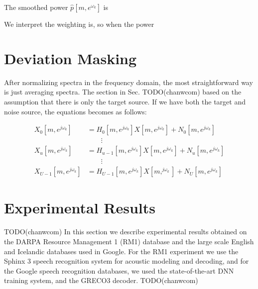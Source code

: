 \documentclass[journal]{IEEEtran}
\begin{document}
The smoothed power $\hat{p}[m, e^{\omega_k}]$ is


We interpret the weighting is, so when the power

% 
% 
% 
% 

\section{Deviation Masking}
After normalizing spectra in the frequency domain, the most straightforward
way is just averaging spectra.
The section in Sec. TODO(chanwcom) based on the assumption that there
is only the target source. If we have both the target and noise source,
the equations becomes as follows:

\begin{subequations}
  \begin{align}
    X_0[m, e^{j\omega_k}]     & = H_0[m, e^{j\omega_k}] X[m, e^{j \omega_k}] + N_0[m, e^{j\omega_k}] \\
                              &  \qquad  \vdots \nonumber \\
    X_u[m, e^{j\omega_k}]     & = H_{u-1}[m, e^{j\omega_k}] X[m, e^{j \omega_k}] + N_u[m, e^{j\omega_k}]\\
                              &  \qquad  \vdots \nonumber \\
      X_{U-1}[m, e^{j\omega_k}] & = H_{U-1}[m, e^{j\omega_k}] X[m, ^{j \omega_k}]+ N_U[m, e^{j\omega_k}]
  \end{align}
  \label{eq:microphone_signals_stft}
\end{subequations}




\section{Experimental Results}
%
TODO(chanwcom) 
In this section we describe experimental results obtained
on the DARPA Resource Management 1 (RM1) database and the large scale
English and Icelandic databases used in Google. For the RM1 experiment
we use the Sphinx 3 speech recognition system for acoustic modeling
and decoding, and for the Google speech recognition databases, we
used the state-of-the-art DNN training system, and the GRECO3
decoder. 
TODO(chanwcom)
\end{document}
